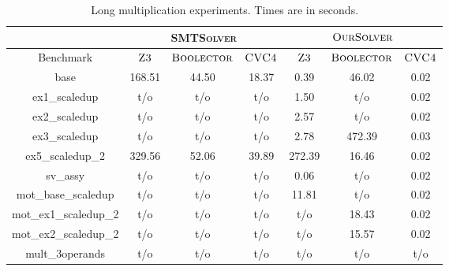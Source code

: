 \begin{table}[t]
\centering
\caption{Long multiplication experiments. Times are in seconds.}
\label{my-label}
\begin{tabular}{|c|c|c|c|c|c|c|}
\hline
                      & \multicolumn{3}{c|}{\textsc{SMTSolver}}       & \multicolumn{3}{c|}{$\textsc{OurSolver}$}       \\ \hline
Benchmark             & $\textsc{Z3}$ & $\textsc{Boolector}$ & $\textsc{CVC4}$ & $\textsc{Z3}$ & $\textsc{Boolector}$ & $\textsc{CVC4}$ \\ \hline
base                  & 168.51  & 44.50       & 18.37     & 0.39     & 46.02        & 0.02      \\ \hline
ex1\_scaledup         & t/o       & t/o          & t/o        & 1.50     & t/o          & 0.02      \\ \hline
ex2\_scaledup         & t/o       & t/o          & t/o        & 2.57     & t/o          & 0.02      \\ \hline
ex3\_scaledup         & t/o       & t/o          & t/o        & 2.78     & 472.39     & 0.03      \\ \hline
ex5\_scaledup\_2      & 329.56  & 52.06       & 39.89     & 272.39  & 16.46       & 0.02      \\ \hline
sv\_assy              & t/o       & t/o          & t/o        & 0.06     & t/o          & 0.02      \\ \hline
mot\_base\_scaledup   & t/o       & t/o          & t/o        & 11.81    & t/o          & 0.02      \\ \hline
mot\_ex1\_scaledup\_2 & t/o       & t/o          & t/o        & t/o       & 18.43       & 0.02      \\ \hline
mot\_ex2\_scaledup\_2 & t/o       & t/o          & t/o        & t/o       & 15.57       & 0.02      \\ \hline
mult\_3operands       & t/o       & t/o          & t/o        & t/o       & t/o          & t/o        \\ \hline
\end{tabular}
\end{table}


